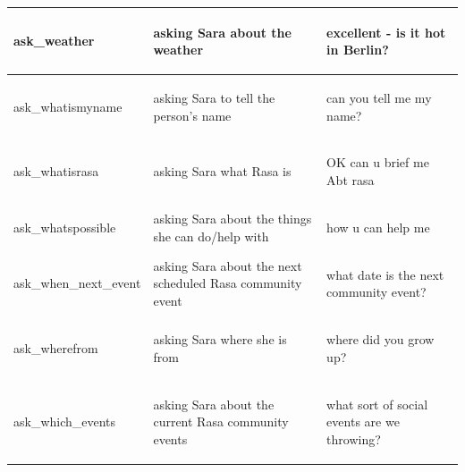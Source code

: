 \documentclass[bsc,frontabs,twoside,singlespacing,parskip,deptreport]{infthesis}
\begin{document}
{\begin{center}
\begin{longtable}{p{}|p{}|p{}}
    \hline
    \begin{spverbatim}ask_weather\end{spverbatim} & asking Sara about the weather & \begin{spverbatim}excellent - is it hot in Berlin?\end{spverbatim} \\
    \hline
    \begin{spverbatim}ask_whatismyname\end{spverbatim} & asking Sara to tell the person's name & \begin{spverbatim}can you tell me my name?\end{spverbatim} \\
    \hline
    \begin{spverbatim}ask_whatisrasa\end{spverbatim} & asking Sara what Rasa is & \begin{spverbatim}OK can u brief me Abt rasa\end{spverbatim} \\
    \hline
    \begin{spverbatim}ask_whatspossible\end{spverbatim} & asking Sara about the things she can do/help with & \begin{spverbatim}how u can help me\end{spverbatim} \\
    \hline
    \begin{spverbatim}ask_when_next_event\end{spverbatim} & asking Sara about the next scheduled Rasa community event & \begin{spverbatim}what date is the next community event?\end{spverbatim} \\
    \hline
    \begin{spverbatim}ask_wherefrom\end{spverbatim} & asking Sara where she is from & \begin{spverbatim}where did you grow up?\end{spverbatim} \\
    \hline
    \begin{spverbatim}ask_which_events\end{spverbatim} & asking Sara about the current Rasa community events & \begin{spverbatim}what sort of social events are we throwing?\end{spverbatim} \\

\end{longtable}
\end{center}}
\end{document}
